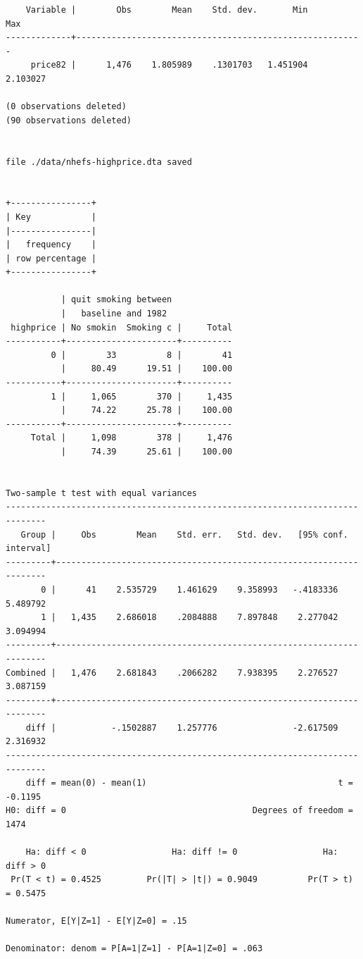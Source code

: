 \documentclass[
  10pt,
]{book}
\begin{document}
\begin{verbatim}
    Variable |        Obs        Mean    Std. dev.       Min        Max
-------------+---------------------------------------------------------
     price82 |      1,476    1.805989    .1301703   1.451904   2.103027

(0 observations deleted)
(90 observations deleted)


file ./data/nhefs-highprice.dta saved


+----------------+
| Key            |
|----------------|
|   frequency    |
| row percentage |
+----------------+

           | quit smoking between
           |   baseline and 1982
 highprice | No smokin  Smoking c |     Total
-----------+----------------------+----------
         0 |        33          8 |        41 
           |     80.49      19.51 |    100.00 
-----------+----------------------+----------
         1 |     1,065        370 |     1,435 
           |     74.22      25.78 |    100.00 
-----------+----------------------+----------
     Total |     1,098        378 |     1,476 
           |     74.39      25.61 |    100.00 


Two-sample t test with equal variances
------------------------------------------------------------------------------
   Group |     Obs        Mean    Std. err.   Std. dev.   [95% conf. interval]
---------+--------------------------------------------------------------------
       0 |      41    2.535729    1.461629    9.358993   -.4183336    5.489792
       1 |   1,435    2.686018    .2084888    7.897848    2.277042    3.094994
---------+--------------------------------------------------------------------
Combined |   1,476    2.681843    .2066282    7.938395    2.276527    3.087159
---------+--------------------------------------------------------------------
    diff |           -.1502887    1.257776               -2.617509    2.316932
------------------------------------------------------------------------------
    diff = mean(0) - mean(1)                                      t =  -0.1195
H0: diff = 0                                     Degrees of freedom =     1474

    Ha: diff < 0                 Ha: diff != 0                 Ha: diff > 0
 Pr(T < t) = 0.4525         Pr(|T| > |t|) = 0.9049          Pr(T > t) = 0.5475

Numerator, E[Y|Z=1] - E[Y|Z=0] = .15

Denominator: denom = P[A=1|Z=1] - P[A=1|Z=0] = .063


\end{verbatim}
\end{document}
